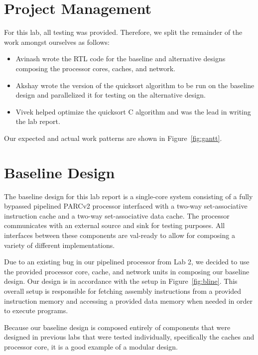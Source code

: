 \documentclass[10pt]{article}
\begin{document}
\section{Project Management}

For this lab, all testing was provided. Therefore, we split the remainder of the work amongst ourselves as follows:
\begin{itemize}
\item Avinash wrote the RTL code for the baseline and alternative designs composing the processor cores, caches, and network.
\item Akshay wrote the version of the quicksort algorithm to be run on the baseline design and parallelized it for testing on the alternative design.
\item Vivek helped optimize the quicksort C algorithm and was the lead in writing the lab report. \par
\end{itemize}

Our expected and actual work patterns are shown in Figure~\ref{fig:gantt}.


\section{Baseline Design}

The baseline design for this lab report is a single-core system consisting of a fully bypassed pipelined PARCv2 
processor interfaced with a two-way set-associative instruction cache and a two-way set-associative data cache. 
The processor communicates with an external source and sink for testing purposes. All interfaces between these
components are val-ready to allow for composing a variety of different implementations. \par

Due to an existing bug in our pipelined processor from Lab 2, we decided to use the provided processor core, 
cache, and network units in composing our baseline design. Our design is in accordance with the setup in 
Figure~\ref{fig:bline}. This overall setup is responsible for fetching assembly instructions from a provided
instruction memory and accessing a provided data memory when needed in order to execute programs.

Because our baseline design is composed entirely of components that were designed in previous labs that were 
tested individually, specifically the caches and processor core, it is a good example of a modular design. 
\end{document}
